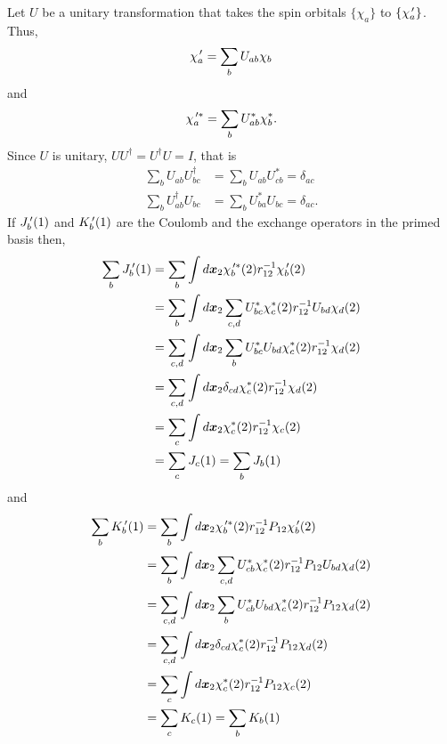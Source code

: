 Let $U$ be a unitary transformation that takes the spin orbitals $\{\chi_a\}$
to $\{\chi_a^{\,\prime}\}$. Thus,
\begin{equation}\label{c3e28}
\chi_a^{\,\prime} = \sum_{b}U_{ab}\chi_b
\end{equation}
and
\begin{equation}\label{c3e29}
\chi_a^{{\,\prime}\ast} = \sum_b U_{ab}^\ast \chi_b^\ast.
\end{equation}
Since $U$ is unitary, $UU^\dagger = U^\dagger U =  I$, that is
\begin{equation}\label{c3e30}
\begin{aligned}
\sum_b U_{ab}U^\dagger_{bc} &= \sum_b U_{ab}U_{cb}^\ast = \delta_{ac} \\
\sum_b U^\dagger_{ab}U_{bc} &= \sum_b U_{ba}^\ast U_{bc} = \delta_{ac}.
\end{aligned}
\end{equation}
If $J_b^{\,\prime}(1)$ and $K_b^{\,\prime}(1)$ are the Coulomb and the
exchange operators in the primed basis then,
\begin{equation}\label{c3e31}
\begin{aligned}
\sum_b J_b^{\,\prime}(1) &= 
\sum_b \int d\bm{x}_2\chi_b^{{\,\prime}\ast}(2)r_{12}^{-1}\chi_b^{\,\prime}(2) \\
 &=\sum_b 
 \int d\bm{x}_2\sum_{c,d}U_{bc}^\ast\chi_c^\ast(2)r_{12}^{-1}U_{bd}\chi_d(2) \\
 &=\sum_{c,d} 
 \int d\bm{x}_2\sum_bU_{bc}^\ast U_{bd}\chi_c^\ast(2)r_{12}^{-1}\chi_d(2) \\
 &= \sum_{c,d} \int d\bm{x}_2\delta_{cd}\chi_c^\ast(2)r_{12}^{-1}\chi_d(2) \\
 &= \sum_c \int d\bm{x}_2 \chi_c^\ast(2)r_{12}^{-1}\chi_c(2) \\
 &= \sum_c J_c(1) = \sum_b J_b(1)
\end{aligned}
\end{equation}
and
\begin{equation}\label{c3e32}
\begin{aligned}
\sum_b K_b^{\,\prime}(1) &= 
\sum_b \int d\bm{x}_2\chi_b^{{\,\prime}\ast}(2)r_{12}^{-1}P_{12}\chi_b^{\,\prime}(2) \\
 &=\sum_b \int d\bm{x}_2\sum_{c,d}U_{cb}^\ast\chi_c^\ast(2)r_{12}^{-1}
   P_{12}U_{bd}\chi_d(2) \\
 &=\sum_{c,d} \int d\bm{x}_2\sum_bU_{cb}^\ast U_{bd}\chi_c^\ast(2)r_{12}^{-1}
   P_{12}\chi_d(2) \\
 &= \sum_{c,d} 
    \int d\bm{x}_2\delta_{cd}\chi_c^\ast(2)r_{12}^{-1}P_{12}\chi_d(2) \\
 &= \sum_c \int d\bm{x}_2 \chi_c^\ast(2)r_{12}^{-1}P_{12}\chi_c(2) \\
 &= \sum_c K_c(1) = \sum_b K_b(1)
\end{aligned}
\end{equation}
